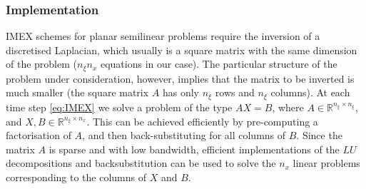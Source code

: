 \documentclass[a4paper,final]{siamart190516}
\newcommand{\Rb}{\mathbb{R}}
\begin{document}
\subsubsection{Implementation}
IMEX schemes for planar semilinear problems require the inversion of a
discretised Laplacian, which usually is a square matrix with the same dimension of
the problem ($n_\xi n_x$ equations in our case). The particular structure of the
problem under consideration, however, implies that the matrix to be inverted is much
smaller (the square matrix $A$ has only $n_\xi$ rows and $n_\xi$ columns). At each
time step
\eqref{eq:IMEX} we solve a problem of the type $AX=B$, where $A \in \Rb^{n_\xi \times
n_\xi}$, and $X, B \in \Rb^{n_\xi \times n_x}$. This can be achieved efficiently by
pre-computing a factorisation of $A$, and then back-substituting for all
columns of $B$. Since the matrix $A$ is sparse and with low bandwidth, efficient
implementations of the $LU$ decompositions and backsubstitution can be used to solve
the $n_x$ linear problems corresponding to the columns of $X$ and $B$.
\end{document}
